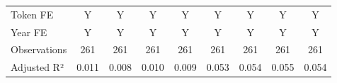 {\begin{tabular}{l*{8}{c}}
\midrule
Token FE            &           Y         &           Y         &           Y         &           Y         &           Y         &           Y         &           Y         &           Y         \\
Year FE             &           Y         &           Y         &           Y         &           Y         &           Y         &           Y         &           Y         &           Y         \\
Observations        &         261         &         261         &         261         &         261         &         261         &         261         &         261         &         261         \\
Adjusted R²         &       0.011         &       0.008         &       0.010         &       0.009         &       0.053         &       0.054         &       0.055         &       0.054         \\
\bottomrule
\end{tabular}
}
